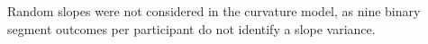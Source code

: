 Random slopes were not considered in the curvature model, as nine binary segment outcomes per participant do not identify a slope variance.


